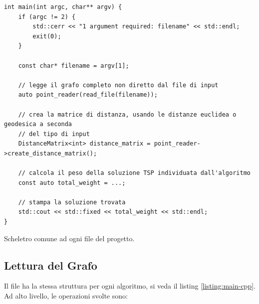 \begin{listing}[!ht]
\begin{verbatim}
int main(int argc, char** argv) {
    if (argc != 2) {
        std::cerr << "1 argument required: filename" << std::endl;
        exit(0);
    }

    const char* filename = argv[1];

    // legge il grafo completo non diretto dal file di input
    auto point_reader(read_file(filename));

    // crea la matrice di distanza, usando le distanze euclidea o geodesica a seconda
    // del tipo di input
    DistanceMatrix<int> distance_matrix = point_reader->create_distance_matrix();

    // calcola il peso della soluzione TSP individuata dall'algoritmo
    const auto total_weight = ...;

    // stampa la soluzione trovata
    std::cout << std::fixed << total_weight << std::endl;
}
\end{verbatim}
\caption{Scheletro comune ad ogni file  del progetto.}
\label{listing:main-cpp}
\end{listing}

\subsection{Lettura del Grafo}

\noindent Il file  ha la stessa struttura per ogni algoritmo, si veda il listing \ref{listing:main-cpp}. Ad alto livello, le operazioni svolte sono:

